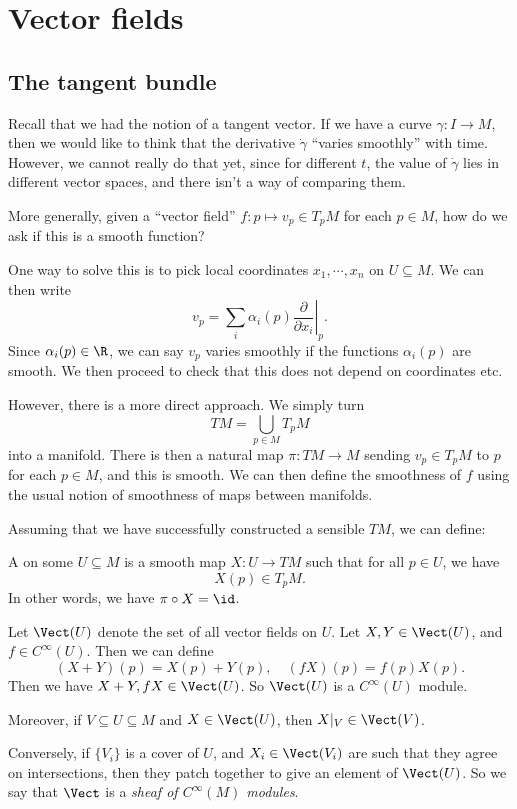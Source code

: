 \documentclass[a4paper]{article}
\begin{document}
\section{Vector fields}
\subsection{The tangent bundle}
Recall that we had the notion of a tangent vector. If we have a curve $\gamma: I \to M$, then we would like to think that the derivative $\dot{\gamma}$ ``varies smoothly'' with time. However, we cannot really do that yet, since for different $t$, the value of $\dot{\gamma}$ lies in different vector spaces, and there isn't a way of comparing them.

More generally, given a ``vector field'' $f: p \mapsto v_p \in T_p M$ for each $p \in M$, how do we ask if this is a smooth function?

One way to solve this is to pick local coordinates $x_1, \cdots,x _n$ on $U \subseteq M$. We can then write
\[
  v_p = \sum_i \alpha_i(p) \left.\frac{\partial}{\partial x_i}\right|_p.
\]
Since $\alpha_i(p) \in \R$, we can say $v_p$ varies smoothly if the functions $\alpha_i(p)$ are smooth. We then proceed to check that this does not depend on coordinates etc.

However, there is a more direct approach. We simply turn
\[
  TM = \bigcup_{p \in M} T_p M
\]
into a manifold. There is then a natural map $\pi: TM \to M$ sending $v_p \in T_pM$ to $p$ for each $p \in M$, and this is smooth. We can then define the smoothness of $f$ using the usual notion of smoothness of maps between manifolds.

Assuming that we have successfully constructed a sensible $TM$, we can define:
\begin{defi}
  A  on some $U \subseteq M$ is a smooth map $X: U \to TM$ such that for all $p \in U$, we have
  \[
    X(p) \in T_p M.
  \]
  In other words, we have $\pi \circ X = \id$.
\end{defi}

\begin{defi}[$\Vect(U)$]
  Let $\Vect(U)$ denote the set of all vector fields on $U$. Let $X, Y \in \Vect(U)$, and $f \in C^\infty(U)$. Then we can define
  \[
    (X + Y)(p) = X(p) + Y(p),\quad (fX)(p) = f(p) X(p).
  \]
  Then we have $X + Y, fX \in \Vect(U)$. So $\Vect(U)$ is a $C^\infty(U)$ module.

  Moreover, if $V \subseteq U \subseteq M$ and $X \in \Vect(U)$, then $X|_V \in \Vect(V)$.

  Conversely, if $\{V_i\}$ is a cover of $U$, and $X_i \in \Vect(V_i)$ are such that they agree on intersections, then they patch together to give an element of $\Vect(U)$. So we say that $\Vect$ is a \emph{sheaf of $C^\infty(M)$ modules}.
\end{defi}
\end{document}
